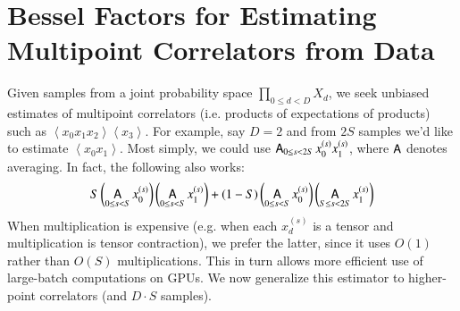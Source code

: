 \documentclass{article}
\theoremstyle{plain}
\theoremstyle{definition}
\newcommand{\wrap}[1]{\left(#1\right)}
\newcommand{\wang}[1]{\left\langle#1\right\rangle}
\DeclareMathOperator*{\Avg}{\text{\sffamily A}}
\begin{document}
\section{Bessel Factors for Estimating Multipoint Correlators from Data}\label{sect:bessel}

    Given samples from a joint probability space $\prod_{0\leq d<D} X_d$, we
    seek unbiased estimates of multipoint correlators (i.e. products of
    expectations of products) such as $\wang{x_0 x_1 x_2}\wang{x_3}$.  For
    example, say $D=2$ and from $2S$ samples we'd like to estimate $\wang{x_0
    x_1}$.  Most simply, we could use $\Avg_{0\leq s<2S} x_0^{(s)} x_1^{(s)}$,
    where $\Avg$ denotes averaging.  In fact, the following also works:
    \begin{equation} \label{eq:bessel}
        S
        \wrap{\Avg_{0\leq s< S} x_0^{(s)}}
        \wrap{\Avg_{0\leq s< S} x_1^{(s)}}
        +
        (1-S)
        \wrap{\Avg_{0\leq s< S} x_0^{(s)}}
        \wrap{\Avg_{S\leq s<2S} x_1^{(s)}}
    \end{equation}
    When multiplication is expensive (e.g. when each $x_d^{(s)}$ is a tensor
    and multiplication is tensor contraction), we prefer the latter, since it
    uses $O(1)$ rather than $O(S)$ multiplications.  This in turn allows more
    efficient use of large-batch computations on GPUs.  We now generalize this
    estimator to higher-point correlators (and $D\cdot S$ samples).
\end{document}
